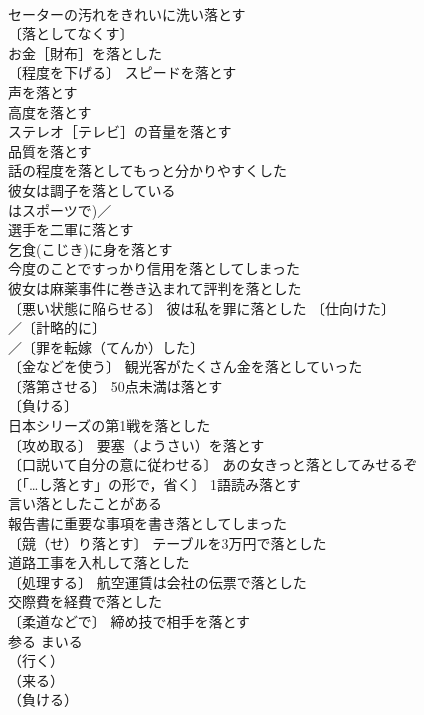 \documentclass[8pt]{extreport}
\begin{document}
\begin{CJK}{UTF8}{min}
\\	セーターの汚れをきれいに洗い落とす 
\\	〔落としてなくす〕
\\	お金［財布］を落とした 
\\	〔程度を下げる〕 スピードを落とす 
\\	声を落とす 
\\	高度を落とす 
\\	ステレオ［テレビ］の音量を落とす 
\\	品質を落とす 
\\	話の程度を落としてもっと分かりやすくした 
\\	彼女は調子を落としている 
\\	はスポーツで)／
\\	選手を二軍に落とす 
\\	乞食(こじき)に身を落とす 
\\	今度のことですっかり信用を落としてしまった 
\\	彼女は麻薬事件に巻き込まれて評判を落とした 
\\	〔悪い状態に陥らせる〕 彼は私を罪に落とした 〔仕向けた〕
\\	／〔計略的に〕
\\	／〔罪を転嫁（てんか）した〕
\\	〔金などを使う〕 観光客がたくさん金を落としていった 
\\	〔落第させる〕 50点未満は落とす 
\\	〔負ける〕
\\	日本シリーズの第1戦を落とした 
\\	〔攻め取る〕 要塞（ようさい）を落とす 
\\	〔口説いて自分の意に従わせる〕 あの女きっと落としてみせるぞ 
\\	〔「…し落とす」の形で，省く〕 1語読み落とす 
\\	言い落としたことがある 
\\	報告書に重要な事項を書き落としてしまった 
\\	〔競（せ）り落とす〕 テーブルを3万円で落とした 
\\	道路工事を入札して落とした 
\\	〔処理する〕 航空運賃は会社の伝票で落とした 
\\	交際費を経費で落とした 
\\	〔柔道などで〕 締め技で相手を落とす 
\\	参る	まいる	
\\	（行く）
\\	（来る）
\\	（負ける）

\end{CJK}
\end{document}
